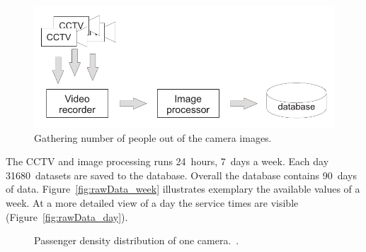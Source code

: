 \begin{figure}[htb]
  \centering
  \includegraphics[width=\linewidth]{Figures/imageProcessing.pdf} 
  \caption{Gathering number of people out of the camera images.}
  \label{fig:CCTVimageProcessing}
\end{figure}

The CCTV and image processing runs 24~hours, 7~days a week. Each day 31680~datasets are saved to the database. Overall the database contains 90~days of data.
Figure~\ref{fig:rawData_week} illustrates exemplary the available values of a week. At a more detailed view of a day the service times are visible (Figure~\ref{fig:rawData_day}).

\begin{figure}[tb]

  \centering

  \hfill

  \caption{Passenger density distribution of one camera.~\cite{TMB}.}
  \label{fig:rawData}

\end{figure}


